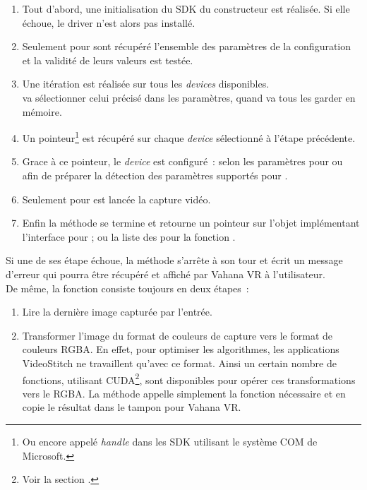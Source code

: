 \begin{enumerate}
  \item Tout d'abord, une initialisation du SDK du constructeur est réalisée. Si
  elle échoue, le driver n'est alors pas installé.
  \item Seulement pour  sont récupéré l'ensemble des paramètres
  de la configuration et la validité de leurs valeurs est testée.
  \item Une itération est réalisée sur tous les \textit{devices} disponibles.\\
   va sélectionner celui précisé dans les paramètres, quand 
  va tous les garder en mémoire.
  \item Un pointeur\footnote{Ou encore appelé \textit{handle} dans les SDK utilisant 
  le système COM de Microsoft.} est récupéré sur chaque \textit{device} sélectionné
  à l'étape précédente.
  \item Grace à ce pointeur, le \textit{device} est configuré~: selon les paramètres
  pour  ou afin de préparer la détection des paramètres supportés pour
  .
  \item Seulement pour  est lancée la capture vidéo.
  \item Enfin la méthode se termine et retourne un pointeur sur l'objet implémentant
  l'interface  pour ; ou la liste des 
  pour la fonction .
\end{enumerate}
Si une de ses étape échoue, la méthode s'arrête à son tour et écrit un message d'erreur
qui pourra être récupéré et affiché par Vahana VR à l'utilisateur.\\
\newline
De même, la fonction  consiste toujours en deux étapes~:
\begin{enumerate}
  \item Lire la dernière image capturée par l'entrée.
  \item Transformer l'image du format de couleurs de capture vers le format de couleurs
  RGBA. En effet, pour optimiser les algorithmes, les applications VideoStitch
  ne travaillent qu'avec ce format. Ainsi un certain nombre de fonctions, utilisant
  CUDA\footnote{Voir la section .}, sont disponibles pour opérer ces transformations vers le RGBA.
  La méthode appelle simplement la fonction nécessaire et en copie le résultat dans le
  tampon  pour Vahana VR.
\end{enumerate}

